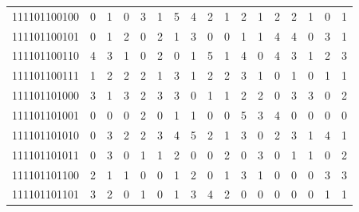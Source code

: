 \documentclass[10pt,a4paper]{article}
\begin{document}
\begin{longtable}{ |c|c|c|c|c|c|c|c|c|c|c|c|c|c|c|c|c| }
    111101100100              & 0                            & 1                                & 0                            & 3                              & 1   & 5   & 4   & 2   & 1   & 2   & 1   & 2   & 2   & 1   & 0   & 1   \\
    111101100101              & 0                            & 1                                & 2                            & 0                              & 2   & 1   & 3   & 0   & 0   & 1   & 1   & 4   & 4   & 0   & 3   & 1   \\
    111101100110              & 4                            & 3                                & 1                            & 0                              & 2   & 0   & 1   & 5   & 1   & 4   & 0   & 4   & 3   & 1   & 2   & 3   \\
    111101100111              & 1                            & 2                                & 2                            & 2                              & 1   & 3   & 1   & 2   & 2   & 3   & 1   & 0   & 1   & 0   & 1   & 1   \\
    111101101000              & 3                            & 1                                & 3                            & 2                              & 3   & 3   & 0   & 1   & 1   & 2   & 2   & 0   & 3   & 3   & 0   & 2   \\
    111101101001              & 0                            & 0                                & 0                            & 2                              & 0   & 1   & 1   & 0   & 0   & 5   & 3   & 4   & 0   & 0   & 0   & 0   \\
    111101101010              & 0                            & 3                                & 2                            & 2                              & 3   & 4   & 5   & 2   & 1   & 3   & 0   & 2   & 3   & 1   & 4   & 1   \\
    111101101011              & 0                            & 3                                & 0                            & 1                              & 1   & 2   & 0   & 0   & 2   & 0   & 3   & 0   & 1   & 1   & 0   & 2   \\
    111101101100              & 2                            & 1                                & 1                            & 0                              & 0   & 1   & 2   & 0   & 1   & 3   & 1   & 0   & 0   & 0   & 3   & 3   \\
    111101101101              & 3                            & 2                                & 0                            & 1                              & 0   & 1   & 3   & 4   & 2   & 0   & 0   & 0   & 0   & 0   & 1   & 1   \\

\end{longtable}
\end{document}
